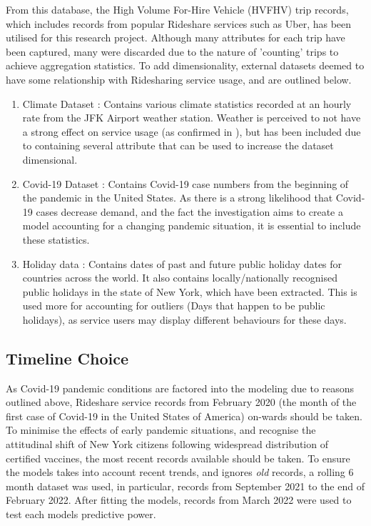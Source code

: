 \documentclass[11pt]{article}
\begin{document}
From this database, the High Volume For-Hire Vehicle (HVFHV) trip records, which includes records from popular Rideshare services such as Uber, has been utilised for this research project. Although many attributes for each trip have been captured, many were discarded due to  the nature of 'counting' trips to achieve aggregation statistics. To add dimensionality, external datasets deemed to have some relationship with Ridesharing service usage, and are outlined below.

\begin{enumerate} 
    \item Climate Dataset \cite{climate}: Contains various climate statistics recorded at an hourly rate from the JFK Airport weather station. Weather is perceived to not have a strong effect on service usage (as confirmed in ), but has been included due to containing several attribute that can be used to increase the dataset dimensional. 
    \item Covid-19 Dataset \cite{covid}: Contains Covid-19 case numbers from the beginning of the pandemic in the United States. As there is a strong likelihood that Covid-19 cases decrease demand, and the fact the investigation aims to create a model accounting for a changing pandemic situation, it is essential to include these statistics.
    \item Holiday data \cite{workalendar}: Contains dates of past and future public holiday dates for countries across the world. It also contains locally/nationally recognised public holidays in the state of New York, which have been extracted. This is used more for accounting for outliers (Days that happen to be public holidays), as service users may display different behaviours for these days.
\end{enumerate}

\subsection{Timeline Choice}
As Covid-19 pandemic conditions are factored into the modeling due to reasons outlined above, Rideshare service records from February 2020 (the month of the first case of Covid-19 in the United States of America) on-wards should be taken. To minimise the effects of early pandemic situations, and recognise the attitudinal shift of New York citizens following widespread distribution of certified vaccines, the most recent records available should be taken. To ensure the models takes into account recent trends, and ignores \textit{old} records, a rolling 6 month dataset was used, in particular, records from September 2021 to the end of February 2022. After fitting the models, records from March 2022 were used to test each models predictive power.
\end{document}
